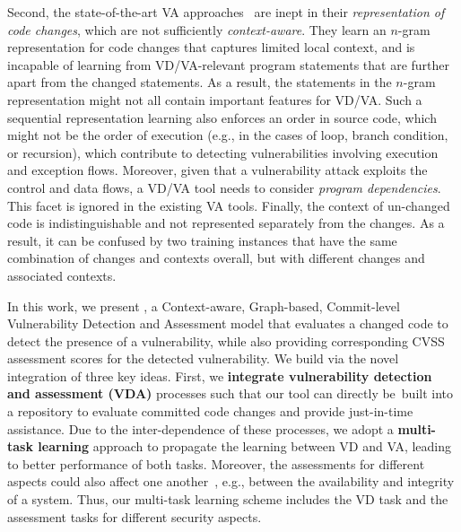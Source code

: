 Second, the state-of-the-art VA approaches~\cite{deepCVA-ase21} are
inept in their {\em representation of code changes},
which are not sufficiently {\em context-aware}.
They learn an $n$-gram
representation for code changes that captures limited local context,
and is incapable of learning from VD/VA-relevant program statements
that are further apart from the changed statements.  As a result, the
statements in the $n$-gram representation might not all contain
important features for VD/VA. Such a sequential representation
learning also enforces an order in source code, which might not be the
order of execution (e.g., in the cases of loop, branch condition, or
recursion), which contribute to detecting vulnerabilities involving
execution and exception flows. Moreover, given that a vulnerability
attack exploits the control and data flows, a VD/VA tool needs to
consider {\em program dependencies}.  This facet is ignored
in the existing VA tools.
Finally, the context of un-changed code is indistinguishable and not
represented separately from the changes. As a result, it can be
confused by two training instances that have the same combination
of changes and contexts overall, but with different changes and
associated contexts.

In this work, we present {\tool}, a Context-aware, Graph-based,
Commit-level Vulnerability Detection and Assessment model that evaluates
a changed code to detect the presence of a vulnerability, while also providing corresponding CVSS
assessment scores for the detected vulnerability.
We build {\tool} via the novel integration of three key ideas.  First,
we {\bf integrate vulnerability detection and assessment (VDA)}
processes such that our tool can directly be~built into a repository
to evaluate committed code changes and provide just-in-time
assistance. Due to the inter-dependence of these processes, we adopt a
{\bf multi-task learning} approach to propagate the learning between
VD and VA, leading to better performance of both tasks. Moreover, the
assessments for different aspects could also affect one
another~\cite{deepCVA-ase21}, e.g., between the availability and
integrity of a system. Thus, our multi-task learning scheme includes
the VD task and the assessment tasks for different security aspects.


